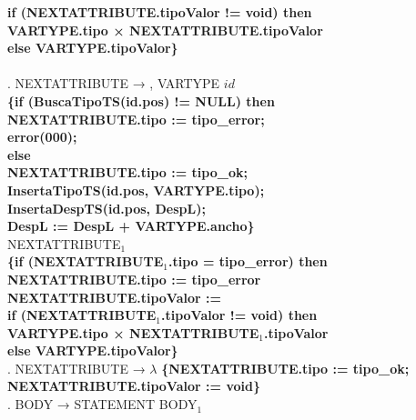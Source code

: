 \begin{tabbing}
    \>              \>          \>      \> \textbf{if (NEXTATTRIBUTE.tipoValor != void) then}\\
    \>              \>          \>      \>  \>\textbf{VARTYPE.tipo × NEXTATTRIBUTE.tipoValor}\\
    \>              \>          \>      \> \textbf{else VARTYPE.tipoValor\}}\\
    \\
    . NEXTATTRIBUTE → , VARTYPE $id$\\
    \>              \>          \> \textbf{\{if (BuscaTipoTS(id.pos) != NULL) then} \\
    \>              \>          \>      \>\textbf{NEXTATTRIBUTE.tipo := tipo\_error;}\\
    \>              \>          \>      \>\textbf{error(000);}\\
    \>              \>          \> \textbf{ else}\\
    \>              \>          \>      \>\textbf{NEXTATTRIBUTE.tipo := tipo\_ok;}\\
    \>              \>          \>      \>\textbf{InsertaTipoTS(id.pos, VARTYPE.tipo);}\\
    \>              \>          \>      \>\textbf{InsertaDespTS(id.pos, DespL);}\\
    \>              \>          \>      \>\textbf{DespL := DespL + VARTYPE.ancho\}}\\
    \>              \>NEXTATTRIBUTE$_1$\\
    \>              \>          \> \textbf{\{if (NEXTATTRIBUTE$_1$.tipo = tipo\_error) then}\\
    \>              \>          \>      \>\textbf{NEXTATTRIBUTE.tipo := tipo\_error}\\
    \>              \>          \> \textbf{ NEXTATTRIBUTE.tipoValor := }\\
    \>              \>          \>      \> \textbf{if (NEXTATTRIBUTE$_1$.tipoValor != void) then}\\
    \>              \>          \>      \>  \>\textbf{VARTYPE.tipo × NEXTATTRIBUTE$_1$.tipoValor}\\
    \>              \>          \>      \> \textbf{else VARTYPE.tipoValor\}}\\
    . NEXTATTRIBUTE → $\lambda$ \textbf{\{NEXTATTRIBUTE.tipo := tipo\_ok;}\\
    \>              \>\textbf{NEXTATTRIBUTE.tipoValor := void\}}\\
    . BODY → STATEMENT BODY$_1$\\

\end{tabbing}
